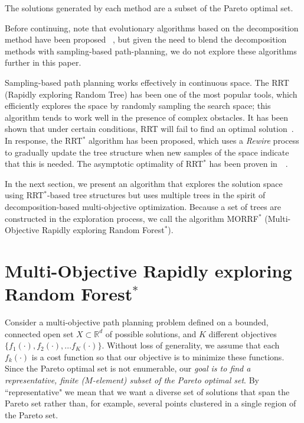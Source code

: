\documentclass{article}
\begin{document}
The solutions generated by each method are a subset of the Pareto optimal set.

Before continuing, note that evolutionary algorithms based on the decomposition method have been proposed ~\cite{6600851}, but given the need to blend the decomposition methods with sampling-based path-planning, we do not explore these algorithms further in this paper.

Sampling-based path planning works effectively in continuous space. 
The RRT (Rapidly exploring Random Tree) has been one of the most popular tools, which  efficiently explores the space by randomly sampling the search space; this algorithm tends to work well in the presence of complex obstacles.
It has been shown that under certain conditions, RRT will fail to find an optimal solution~\cite{Karaman.Frazzoli:RSS10}. 
In response, the RRT$^{*}$ algorithm has been proposed, which uses a \emph{Rewire} process to gradually update the tree structure when new samples of the space indicate that this is needed.
The asymptotic optimality of RRT$^{*}$ has been proven in~\cite{Karaman.Frazzoli:RSS10}~\cite{Karaman:2011:SAO:2000201.2000209}. 

In the next section, we present an algorithm that explores the solution space using RRT$^{*}$-based tree structures but uses multiple trees in the spirit of decomposition-based multi-objective optimization.
Because a set of trees are constructed in the exploration process, we call the algorithm MORRF$^{*}$ (Multi-Objective Rapidly exploring Random Forest$^{*}$).


\section{Multi-Objective Rapidly exploring Random Forest$^{*}$}
\label{sec:morrt}

Consider a multi-objective path planning problem defined on a bounded, connected open set $X\subset\mathbb{R}^d$ of possible solutions, and $K$ different objectives $\{f_1(\cdot), f_2(\cdot), ... f_{K}(\cdot)\}$. 
Without loss of generality, we assume that each $f_k(\cdot)$ is a cost function so that our objective is to minimize these functions.  
Since the Pareto optimal set is not enumerable, our {\em goal is to find a representative, finite ($M$-element) subset of the Pareto optimal set}.  
By ``representative" we mean that we want a diverse set of solutions that span the Pareto set rather than, for example, several points clustered in a single region of the Pareto set.  
\end{document}
